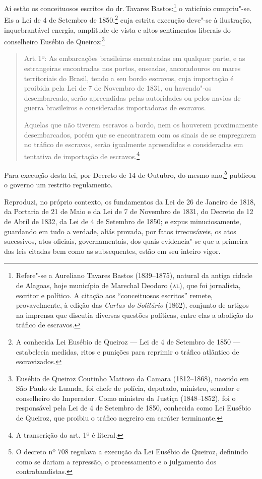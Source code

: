Aí estão os conceituosos escritos do dr.\,Tavares Bastos:\footnote{
  Refere"-se a Aureliano Tavares Bastos (1839--1875), natural da antiga
  cidade de Alagoas, hoje município de Marechal Deodoro (\textsc{al}), que foi
  jornalista, escritor e político. A citação aos ``conceituosos escritos''
  remete, provavelmente, à edição das \emph{Cartas do Solitário} (1862),
  conjunto de artigos na imprensa que discutia diversas questões
  políticas, entre elas a abolição do tráfico de escravos.} o vaticínio
cumpriu"-se. Eis a Lei de 4 de Setembro de 1850,\footnote{A conhecida
  Lei Eusébio de Queiroz --- Lei de 4 de Setembro de 1850 --- estabelecia
  medidas, ritos e punições para reprimir o tráfico atlântico de
  escravizados.} cuja estrita execução deve"-se à ilustração,
inquebrantável energia, amplitude de vista e altos sentimentos liberais
do conselheiro Eusébio de Queiroz:\footnote{Eusébio de Queiroz
  Coutinho Mattoso da Camara (1812--1868), nascido em São Paulo de
  Luanda, foi chefe de polícia, deputado, ministro, senador e
  conselheiro do Imperador. Como ministro da Justiça (1848--1852), foi o
  responsável pela Lei de 4 de Setembro de 1850, conhecida como Lei
  Eusébio de Queiroz, que proibiu o tráfico negreiro em caráter
  terminante.}

\begin{quote}
Art.\,1º: As embarcações brasileiras encontradas em qualquer parte, e as
estrangeiras encontradas nos portos, enseadas, ancoradouros ou mares
territoriais do Brasil, tendo a seu bordo escravos, cuja importação é
proibida pela Lei de 7 de Novembro de 1831, ou havendo"-os desembarcado,
serão apreendidas pelas autoridades ou pelos navios de guerra
brasileiros e consideradas importadoras de escravos.

Aquelas que não tiverem escravos a bordo, nem os houverem proximamente
desembarcados, porém que se encontrarem com os sinais de se empregarem
no tráfico de escravos, serão igualmente apreendidas e consideradas em
tentativa de importação de escravos.\footnote{A transcrição do art.
  1º é literal.}
\end{quote}  

Para execução desta lei, por Decreto de 14 de Outubro, do mesmo
ano,\footnote{O decreto nº 708 regulava a execução da Lei Eusébio de
  Queiroz, definindo como se dariam a repressão, o processamento e o
  julgamento dos contrabandistas.} publicou o governo um restrito
regulamento.

\asterisc

Reproduzi, no próprio contexto, os fundamentos da Lei de 26 de Janeiro
de 1818, da Portaria de 21 de Maio e da Lei de 7 de Novembro de 1831, do
Decreto de 12 de Abril de 1832, da Lei de 4 de Setembro de 1850; e expus
minuciosamente, guardando em tudo a verdade, aliás provada, por fatos
irrecusáveis, os atos sucessivos, atos oficiais, governamentais, dos
quais evidencia"-se que a primeira das leis citadas bem como as
subsequentes, estão em seu inteiro vigor.


